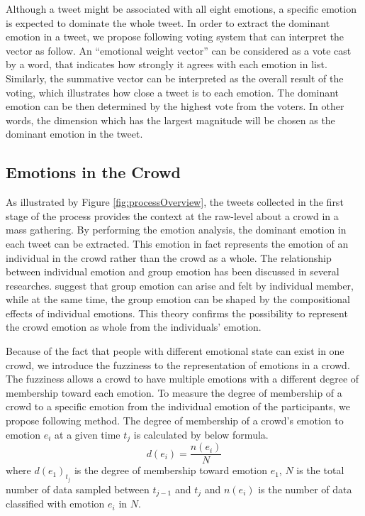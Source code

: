 Although a tweet might be associated with all eight emotions, a specific emotion is expected to dominate the whole tweet. In order to extract the dominant emotion in a tweet, we propose following voting system that can interpret the vector as follow. An ``emotional weight vector'' can be considered as a vote cast by a word, that indicates how strongly it agrees with each emotion in list. Similarly, the summative vector can be interpreted as the overall result of the voting, which illustrates how close a tweet is to each emotion. The dominant emotion can be then determined by the highest vote from the voters. In other words, the dimension which has the largest magnitude will be chosen as the dominant emotion in the tweet.

\subsection{Emotions in the Crowd}
As illustrated by Figure \ref{fig:processOverview}, the tweets collected in the first stage of the process provides the context at the raw-level about a crowd in a mass gathering. By performing the emotion analysis, the dominant emotion in each tweet can be extracted. This emotion in fact represents the emotion of an individual in the crowd rather than the crowd as a whole. The relationship between individual emotion and group emotion has been discussed in several researches. \citet{barsade1998group} suggest that group emotion can arise and felt by individual member, while at the same time, the group emotion can be shaped by the compositional effects of individual emotions. This theory confirms the possibility to represent the crowd emotion as whole from the individuals' emotion.

Because of the fact that people with different emotional state can exist in one crowd, we introduce the fuzziness to the representation of emotions in a crowd. The fuzziness allows a crowd to have multiple emotions with a different degree of membership toward each emotion. To measure the degree of membership of a crowd to a specific emotion from the individual emotion of the participants, we propose following method. The degree of membership of a crowd's emotion to emotion \(e_i\) at a given time \(t_j\) is calculated by below formula.
\[
	d(e_i) = \frac{n(e_i)}{N}
\]
where \(d(e_1)_{t_j}\) is the degree of membership toward emotion \(e_1\), \(N\) is the total number of data sampled between \(t_{j-1}\) and \(t_j\) and \(n(e_i)\) is the number of data classified with emotion \(e_i\) in \(N\).

